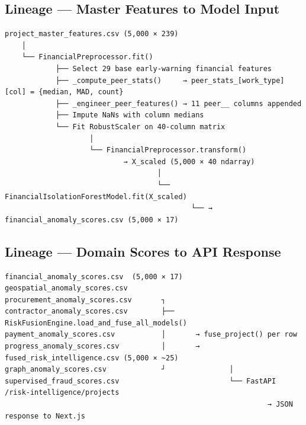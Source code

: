 \documentclass[11pt,a4paper]{article}
\begin{document}
\subsection{Lineage --- Master Features to Model Input}

\begin{tcolorbox}[colback=gray!5!white,colframe=gray!60!black,arc=1mm,boxrule=0.6pt,left=6pt,right=6pt,top=6pt,bottom=6pt]
\begin{lstlisting}[basicstyle=\ttfamily\scriptsize,breaklines=true,columns=flexible]
project_master_features.csv (5,000 × 239)
    │
    └── FinancialPreprocessor.fit()
            ├── Select 29 base early-warning financial features
            ├── _compute_peer_stats()     → peer_stats_[work_type][col] = {median, MAD, count}
            ├── _engineer_peer_features() → 11 peer__ columns appended
            ├── Impute NaNs with column medians
            └── Fit RobustScaler on 40-column matrix
                    │
                    └── FinancialPreprocessor.transform()
                            → X_scaled (5,000 × 40 ndarray)
                                    │
                                    └── FinancialIsolationForestModel.fit(X_scaled)
                                            └── → financial_anomaly_scores.csv (5,000 × 17)
\end{lstlisting}
\end{tcolorbox}


\subsection{Lineage --- Domain Scores to API Response}

\begin{tcolorbox}[colback=gray!5!white,colframe=gray!60!black,arc=1mm,boxrule=0.6pt,left=6pt,right=6pt,top=6pt,bottom=6pt]
\begin{lstlisting}[basicstyle=\ttfamily\scriptsize,breaklines=true,columns=flexible]
financial_anomaly_scores.csv  (5,000 × 17)
geospatial_anomaly_scores.csv
procurement_anomaly_scores.csv       ┐
contractor_anomaly_scores.csv        ├── RiskFusionEngine.load_and_fuse_all_models()
payment_anomaly_scores.csv           │       → fuse_project() per row
progress_anomaly_scores.csv          │       → fused_risk_intelligence.csv (5,000 × ~25)
graph_anomaly_scores.csv             ┘               │
supervised_fraud_scores.csv                          └── FastAPI /risk-intelligence/projects
                                                              → JSON response to Next.js
\end{lstlisting}
\end{tcolorbox}
\end{document}
